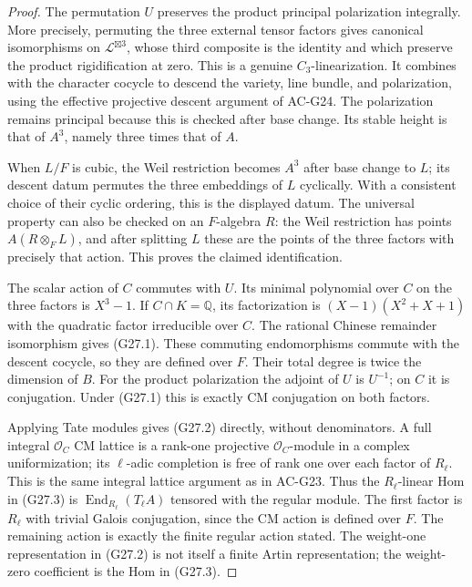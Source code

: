 \begin{proof}
The permutation $U$ preserves the product principal polarization
integrally.  More precisely, permuting the three external tensor
factors gives canonical isomorphisms on
$\mathcal L^{\boxtimes3}$, whose third composite is the identity
and which preserve the product rigidification at zero.  This is a
genuine $C_3$-linearization.  It combines with the character
cocycle to descend the variety, line bundle, and polarization,
using the effective projective descent argument of AC-G24.
The polarization remains principal because this is checked after
base change.  Its stable height is that of $A^3$, namely three
times that of $A$.

When $L/F$ is cubic, the Weil restriction becomes $A^3$ after
base change to $L$; its descent datum permutes the three embeddings
of $L$ cyclically.  With a consistent choice of their cyclic
ordering, this is the displayed datum.  The universal property
can also be checked on an $F$-algebra $R$: the Weil restriction
has points $A(R\otimes_F L)$, and after splitting $L$ these
are the points of the three factors with precisely that action.
This proves the claimed identification.

The scalar action of $C$ commutes with $U$.  Its minimal
polynomial over $C$ on the three factors is $X^3-1$.
If $C\cap K=\mathbb Q$, its factorization is
$(X-1)(X^2+X+1)$ with the quadratic factor irreducible over $C$.
The rational Chinese remainder isomorphism gives (G27.1).
These commuting endomorphisms commute with the descent cocycle,
so they are defined over $F$.  Their total degree is twice the
dimension of $B$.  For the product polarization the adjoint of
$U$ is $U^{-1}$; on $C$ it is conjugation.  Under (G27.1)
this is exactly CM conjugation on both factors.

Applying Tate modules gives (G27.2) directly, without denominators.
A full integral $\mathcal O_C$ CM lattice is a rank-one
projective $\mathcal O_C$-module in a complex uniformization;
its $\ell$-adic completion is free of rank one over each factor
of $R_\ell$.  This is the same integral lattice argument as
in AC-G23.  Thus the $R_\ell$-linear Hom in (G27.3) is
$\operatorname{End}_{R_\ell}(T_\ell A)$ tensored with the
regular module.  The first factor is $R_\ell$ with trivial
Galois conjugation, since the CM action is defined over $F$.
The remaining action is exactly the finite regular action stated.
The weight-one representation in (G27.2) is not itself a finite
Artin representation; the weight-zero coefficient is the Hom
in (G27.3).


\end{proof}
